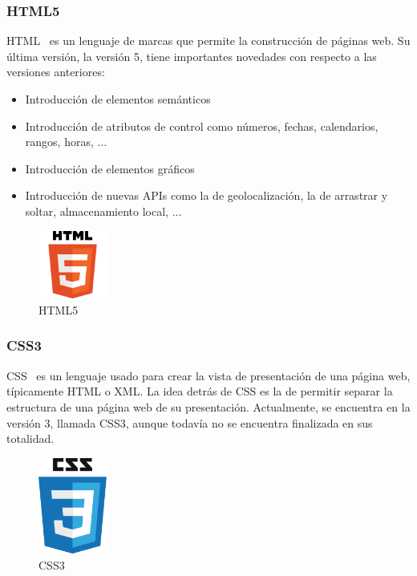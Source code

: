 \subsubsection*{HTML5}

HTML~\cite{html5} es un lenguaje de marcas que permite la construcción de páginas web. Su última versión, la versión 5, tiene importantes novedades con respecto a las versiones anteriores:

\begin{itemize}
\item Introducción de elementos semánticos
\item Introducción de atributos de control como números, fechas, calendarios, rangos, horas, ...
\item Introducción de elementos gráficos
\item Introducción de nuevas APIs como la de geolocalización, la de arrastrar y soltar, almacenamiento local, ...
\end{itemize}

\begin{figure}[tbh]
\centering
\label{fig:html5}
\includegraphics[width=0.2\textwidth]{imagenes/html5}
\caption{HTML5}
\end{figure}

\subsubsection*{CSS3}
CSS~\cite{css3} es un lenguaje usado para crear la vista de presentación de una página web, típicamente HTML o XML. La idea detrás de CSS es la de permitir separar la estructura de una página web de su presentación. Actualmente, se encuentra en la versión 3, llamada CSS3, aunque todavía no se encuentra finalizada en sus totalidad.

\begin{figure}[tbh]
\centering
\label{fig:css3}
\includegraphics[width=0.2\textwidth]{imagenes/css3}
\caption{CSS3}
\end{figure}

